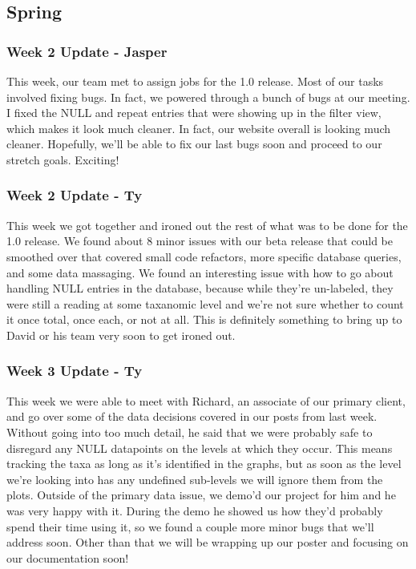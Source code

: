 \subsection{Spring}

\subsubsection{Week 2 Update - Jasper}
This week, our team met to assign jobs for the 1.0 release.
Most of our tasks involved fixing bugs.
In fact, we powered through a bunch of bugs at our meeting.
I fixed ​the NULL and repeat entries that were showing up in the filter view, which makes it look much cleaner.
In fact, our website overall is looking much cleaner.
Hopefully, we'll be able to fix our last bugs soon and proceed to our stretch goals.
Exciting!

\subsubsection{Week 2 Update - Ty}
This week we got together and ironed out the rest of what was to be done for the 1.0 release.
We found about 8 minor issues with our beta release that could be smoothed over that covered small code refactors, more specific database queries, and some data massaging.
We found an interesting issue with how to go about handling NULL entries in the database, because while they're un-labeled, they were still a reading at some taxanomic level and we're not sure whether to count it once total, once each, or not at all.
This is definitely something to bring up to David or his team very soon to get ironed out. ​

\subsubsection{Week 3 Update - Ty}
This week we were able to meet with Richard, an associate of our primary client, and go over some of the data decisions covered in our posts from last week.
Without going into too much detail, he said that we were probably safe to disregard any NULL datapoints on the levels at which they occur.
This means tracking the taxa as long as it's identified in the graphs, but as soon as the level we're looking into has any undefined sub-levels we will ignore them from the plots.
Outside of the primary data issue, we demo'd our project for him and he was very happy with it.
During the demo he showed us how  they'd probably spend their time using it, so we found a couple more minor bugs that we'll address soon.
Other than that we will be wrapping up our poster and focusing on our documentation soon!

